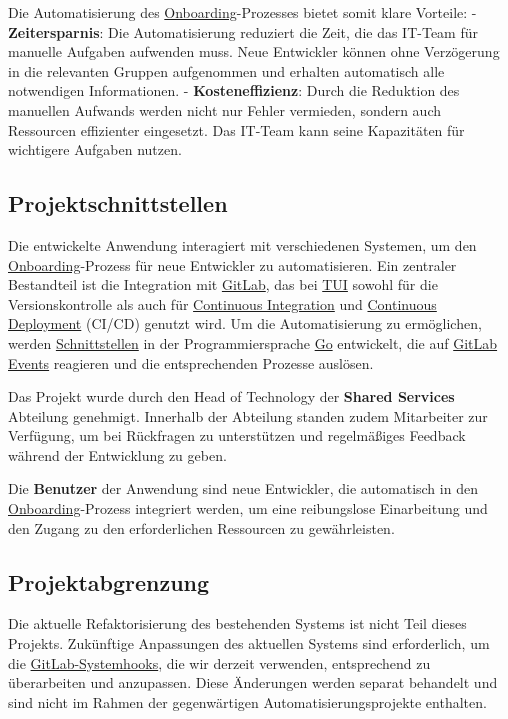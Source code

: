 Die Automatisierung des \hyperlink{Onboarding}{\textcolor{AOBlau}{Onboarding}}-Prozesses bietet somit klare Vorteile:
- \textbf{Zeitersparnis}: Die Automatisierung reduziert die Zeit, die das IT-Team für manuelle Aufgaben aufwenden muss. Neue Entwickler können ohne Verzögerung in die relevanten Gruppen aufgenommen und erhalten automatisch alle notwendigen Informationen.
- \textbf{Kosteneffizienz}: Durch die Reduktion des manuellen Aufwands werden nicht nur Fehler vermieden, sondern auch Ressourcen effizienter eingesetzt. Das IT-Team kann seine Kapazitäten für wichtigere Aufgaben nutzen.


\subsection{Projektschnittstellen} 
\label{sec:Projektschnittstellen}

Die entwickelte Anwendung interagiert mit verschiedenen Systemen, um den \hyperlink{Onboarding}{\textcolor{AOBlau}{Onboarding}}-Prozess für neue Entwickler zu automatisieren. Ein zentraler Bestandteil ist die Integration mit \hyperlink{GitLab}{\textcolor{AOBlau}{GitLab}}, das bei \hyperlink{TUI}{\textcolor{AOBlau}{TUI}} sowohl für die Versionskontrolle als auch für \hyperlink{CI}{\textcolor{AOBlau}{Continuous Integration}} und \hyperlink{CD}{\textcolor{AOBlau}{Continuous Deployment}} (CI/CD) genutzt wird. Um die Automatisierung zu ermöglichen, werden \hyperlink{Schnittstelle}{\textcolor{AOBlau}{Schnittstellen}} in der Programmiersprache \hyperlink{Go}{\textcolor{AOBlau}{Go}} entwickelt, die auf \hyperlink{GitLab}{\textcolor{AOBlau}{GitLab Events}} reagieren und die entsprechenden Prozesse auslösen.

Das Projekt wurde durch den Head of Technology der \textbf{Shared Services} Abteilung genehmigt. Innerhalb der Abteilung standen zudem Mitarbeiter zur Verfügung, um bei Rückfragen zu unterstützen und regelmäßiges Feedback während der Entwicklung zu geben.

Die \textbf{Benutzer} der Anwendung sind neue Entwickler, die automatisch in den \hyperlink{Onboarding}{\textcolor{AOBlau}{Onboarding}}-Prozess integriert werden, um eine reibungslose Einarbeitung und den Zugang zu den erforderlichen Ressourcen zu gewährleisten.

\subsection{Projektabgrenzung} 
\label{sec:Projektabgrenzung}

Die aktuelle Refaktorisierung des bestehenden Systems ist nicht Teil dieses Projekts. Zukünftige Anpassungen des aktuellen Systems sind erforderlich, um die \hyperlink{GitLabSystemhooks}{\textcolor{AOBlau}{GitLab-Systemhooks}}, die wir derzeit verwenden, entsprechend zu überarbeiten und anzupassen. Diese Änderungen werden separat behandelt und sind nicht im Rahmen der gegenwärtigen Automatisierungsprojekte enthalten.
